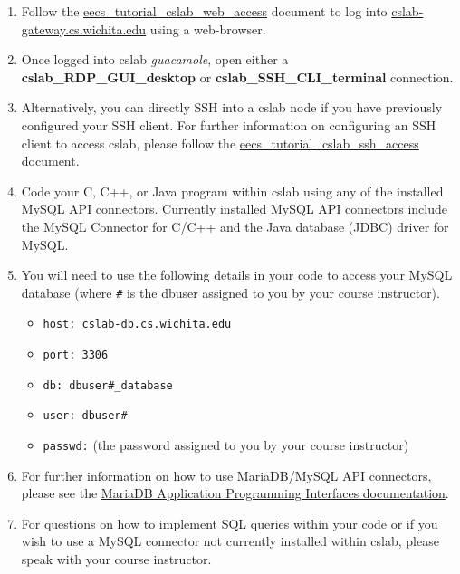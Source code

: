 \documentclass[12pt]{article}
\begin{document}
\begin{flushleft}
\begin{enumerate}
  \item Follow the \href{https://github.com/benroose/tutorials/blob/master/cslab_tutorials/eecs_tutorial_cslab_web_access.pdf}{eecs\_tutorial\_cslab\_web\_access} document to log into \href{https://cslab-gateway.cs.wichita.edu/}{cslab-gateway.cs.wichita.edu} using a web-browser.
  \item Once logged into cslab \textit{guacamole}, open either a \textbf{cslab\_RDP\_GUI\_desktop} or \textbf{cslab\_SSH\_CLI\_terminal} connection.
  \item Alternatively, you can directly SSH into a cslab node if you have previously configured your SSH client. For further information on configuring an SSH client to access cslab, please follow the \href{https://github.com/benroose/tutorials/blob/master/cslab_tutorials/eecs_tutorial_cslab_ssh_access.pdf}{eecs\_tutorial\_cslab\_ssh\_access} document.
  \item Code your C, C++, or Java program within cslab using any of the installed MySQL API connectors. \break
    Currently installed MySQL API connectors include the MySQL Connector for C/C++ and the Java database (JDBC) driver for MySQL.
  \item You will need to use the following details in your code to access your MySQL database (where \texttt{\#} is the dbuser assigned to you by your course instructor).
    \begin{itemize}
      \item \verb|host: cslab-db.cs.wichita.edu|
      \item \verb|port: 3306|
      \item \verb|db: dbuser#_database|
      \item \verb|user: dbuser#|
      \item \verb|passwd:| (the password assigned to you by your course instructor)
    \end{itemize}
  \item For further information on how to use MariaDB/MySQL API connectors, please see the \href{https://mariadb.com/kb/en/library/connectors/}{MariaDB Application Programming Interfaces documentation}.
  \item For questions on how to implement SQL queries within your code or if you wish to use a MySQL connector not currently installed within cslab, please speak with your course instructor.
\end{enumerate}


\end{flushleft}
\end{document}
